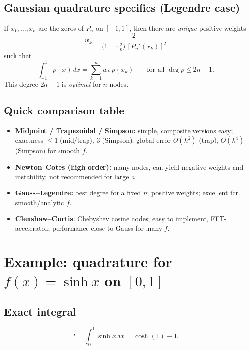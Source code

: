 \documentclass[12pt,a4paper]{article}
\theoremstyle{plain}
\theoremstyle{definition}
\theoremstyle{remark}
\theoremstyle{remark}
\begin{document}
\bigskip

\subsection*{Gaussian quadrature specifics (Legendre case)}
If $x_1,\dots,x_n$ are the zeros of $P_n$ on $[-1,1]$, then there are \emph{unique} positive weights
\[
w_k=\frac{2}{\bigl(1-x_k^2\bigr)\,[P_n'(x_k)]^2}
\]
such that
\[
\int_{-1}^{1} p(x)\,dx=\sum_{k=1}^{n} w_k\,p(x_k)\qquad \text{for all } \deg p\le 2n-1.
\]
This degree $2n-1$ is \emph{optimal} for $n$ nodes.

\bigskip

\subsection*{Quick comparison table}

\begin{itemize}\setlength{\itemsep}{0.5em}
	\item \textbf{Midpoint / Trapezoidal / Simpson:}
	simple, composite versions easy; exactness $\le 1$ (mid/trap), $3$ (Simpson); global error $O(h^2)$ (trap), $O(h^4)$ (Simpson) for smooth $f$.
	\item \textbf{Newton--Cotes (high order):}
	many nodes, can yield negative weights and instability; not recommended for large $n$.
	\item \textbf{Gauss--Legendre:}
	best degree for a fixed $n$; positive weights; excellent for smooth/analytic $f$.
	\item \textbf{Clenshaw--Curtis:}
	Chebyshev cosine nodes; easy to implement, FFT-accelerated; performance close to Gauss for many $f$.
\end{itemize}
\section*{Example: quadrature for $f(x)=\sinh x$ on $[0,1]$}

\subsection*{Exact integral}
\[
I=\int_{0}^{1}\sinh x\,dx=\cosh(1)-1.
\]
\end{document}

